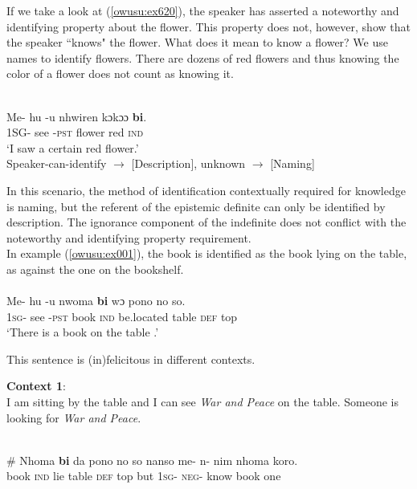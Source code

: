 \documentclass[output=paper,modfonts,nonflat,draftmode]{langsci/langscibook}
\begin{document}
If we take a look at (\ref{owusu:ex620}), the speaker has asserted a noteworthy and identifying property about the flower.  This property does not, however, show that the speaker ``knows" the flower. What does it mean to know a flower? We use names to identify flowers. There are dozens of red flowers and thus knowing the color of a flower does not count as knowing it. 


\ea\label{owusu:ex620}\\
\gll Me- hu -u nhwiren kɔkɔɔ \textbf{bi}.\\
 1SG- see -\textsc{pst}  flower red \textsc{ind} \\
\glt `I saw a certain red flower.'\\
Speaker-can-identify $\rightarrow$ [Description], unknown $\rightarrow$  [Naming]

 \z  
In this scenario, the method of identification contextually required for knowledge is naming, but the referent of the epistemic definite can only be identified by description. The ignorance component of the indefinite does not conflict with the noteworthy and identifying property requirement.\\

In example (\ref{owusu:ex001}), the book is identified as the book lying on the table, as against the one on the bookshelf.  \\
\ea\label{owusu:ex001}\\
\gll Me- hu -u nwoma \textbf{bi} wɔ pono no so.\\
	     \textsc{1sg}- see -\textsc{pst}  book \textsc{ind} be.located table \textsc{def}  top\\

\glt `There is a book on the table .'\\

 \z 
 
This sentence is (in)felicitous in different contexts.

\textbf{Context 1}:\\
I am sitting by the table and I can see \emph{\emph{War and Peace}} on the table. Someone is looking for \emph{\emph{War and Peace}}.

\ea\label{owusu:ex00}\\
\gll \# Nhoma \textbf{bi} da pono no so nanso me- n- nim nhoma koro.\\
	     {} book \textsc{ind}  lie table \textsc{def}  top but \textsc{1sg}- \textsc{neg}- know book one\\
\end{document}
